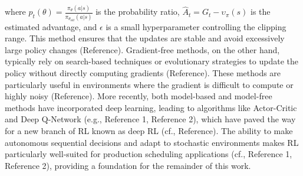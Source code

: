 where
\(p_{t}(\theta) = \frac{\pi_{\theta}\left( a|s \right)}{\pi_{\theta_{old}}\left( a|s \right)}\)
is the probability ratio,
\({\widehat{A}}_{t} = G_{t} - \upsilon_{\pi}(s)\) is the estimated
advantage, and \(\epsilon\) is a small hyperparameter controlling the
clipping range. This method ensures that the updates are stable and
avoid excessively large policy changes (\colorbox{yellow!40}{Reference}). Gradient-free
methods, on the other hand, typically rely on search-based techniques or
evolutionary strategies to update the policy without directly computing
gradients (\colorbox{yellow!40}{Reference}). These methods are particularly useful in
environments where the gradient is difficult to compute or highly noisy
(\colorbox{yellow!40}{Reference}). More recently, both model-based and model-free methods
have incorporated deep learning, leading to algorithms like Actor-Critic
and Deep Q-Network (\colorbox{yellow!40}{e.g., Reference 1, Reference 2}), which have
paved the way for a new branch of RL known as deep RL (\colorbox{yellow!40}{cf.,
Reference}). The ability to make autonomous sequential decisions and
adapt to stochastic environments makes RL particularly well-suited for
production scheduling applications (\colorbox{yellow!40}{cf., Reference 1, Reference 2}),
providing a foundation for the remainder of this work.

